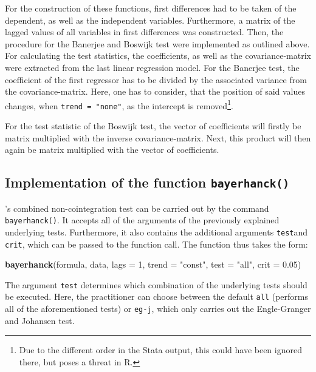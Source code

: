 \documentclass[11pt,a4paper]{article}
\newenvironment{Shaded}{\begin{snugshade}}{\end{snugshade}}
\newcommand{\DataTypeTok}[1]{\textcolor[rgb]{0.13,0.29,0.53}{#1}}
\newcommand{\DecValTok}[1]{\textcolor[rgb]{0.00,0.00,0.81}{#1}}
\newcommand{\FloatTok}[1]{\textcolor[rgb]{0.00,0.00,0.81}{#1}}
\newcommand{\KeywordTok}[1]{\textcolor[rgb]{0.13,0.29,0.53}{\textbf{#1}}}
\newcommand{\NormalTok}[1]{#1}
\newcommand{\StringTok}[1]{\textcolor[rgb]{0.31,0.60,0.02}{#1}}
\let\rmarkdownfootnote\footnote%
\def\footnote{\protect\rmarkdownfootnote}
\begin{document}
For the construction of these functions, first differences had to be
taken of the dependent, as well as the independent variables.
Furthermore, a matrix of the lagged values of all variables in first
differences was constructed. Then, the procedure for the Banerjee and
Boswijk test were implemented as outlined above. For calculating the
test statistics, the coefficients, as well as the covariance-matrix were
extracted from the last linear regression model. For the Banerjee test,
the coefficient of the first regressor has to be divided by the
associated variance from the covariance-matrix. Here, one has to
consider, that the position of said values changes, when
\texttt{trend\ =\ "none"}, as the intercept is removed\footnote{Due to
  the different order in the Stata output, this could have been ignored
  there, but poses a threat in R.}.

For the test statistic of the Boswijk test, the vector of coefficients
will firstly be matrix multiplied with the inverse covariance-matrix.
Next, this product will then again be matrix multiplied with the vector
of coefficients.

\hypertarget{implementation-of-the-function-bayerhanck}{%
\subsection{\texorpdfstring{Implementation of the function
\texttt{bayerhanck()}}{Implementation of the function bayerhanck()}}\label{implementation-of-the-function-bayerhanck}}

\textcite{Bayerhanck2009}'s combined non-cointegration test can be
carried out by the command \texttt{bayerhanck()}. It accepts all of the
arguments of the previously explained underlying tests. Furthermore, it
also contains the additional arguments \texttt{test}and \texttt{crit},
which can be passed to the function call. The function thus takes the
form:

\begin{Shaded}
\begin{Highlighting}[]
\KeywordTok{bayerhanck}\NormalTok{(formula, data, }\DataTypeTok{lags =} \DecValTok{1}\NormalTok{, }\DataTypeTok{trend =} \StringTok{"const"}\NormalTok{, }
           \DataTypeTok{test =} \StringTok{"all"}\NormalTok{, }\DataTypeTok{crit =} \FloatTok{0.05}\NormalTok{)}
\end{Highlighting}
\end{Shaded}

The argument \texttt{test} determines which combination of the
underlying tests should be executed. Here, the practitioner can choose
between the default \texttt{all} (performs all of the aforementioned
tests) or \texttt{eg-j}, which only carries out the Engle-Granger and
Johansen test.
\end{document}
